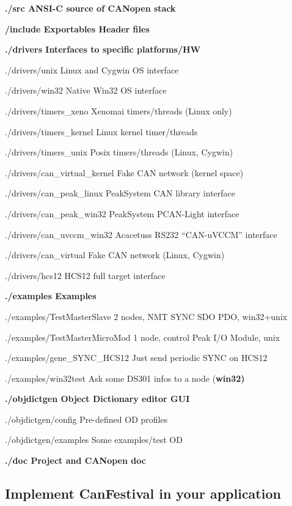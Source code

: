 \documentclass[a4paper,12pt]{book}
\newcommand{\canopen}{CANopen}
\begin{document}
{\ttfamily\bfseries
./src ANSI{}-C source of \canopen{} stack}

{\ttfamily\bfseries
\space /include Exportables Header files}

{\ttfamily\bfseries
./drivers Interfaces to specific platforms/HW}

{\ttfamily
./drivers/unix Linux and Cygwin OS interface}

{\ttfamily
./drivers/win32 Native Win32 OS interface}

{\ttfamily
./drivers/timers\_xeno Xenomai timers/threads (Linux only)}

{\ttfamily
./drivers/timers\_kernel Linux kernel timer/threads}

{\ttfamily
./drivers/timers\_unix Posix timers/threads (Linux, Cygwin)}

{\ttfamily
./drivers/can\_virtual\_kernel Fake CAN network (kernel space)}

{\ttfamily
./drivers/can\_peak\_linux PeakSystem CAN library interface}

{\ttfamily
./drivers/can\_peak\_win32 PeakSystem PCAN{}-Light interface}

{\ttfamily
./drivers/can\_uvccm\_win32 Acacetus{\textquotesingle}s RS232
``CAN{}-uVCCM'' interface}

{\ttfamily
./drivers/can\_virtual Fake CAN network (Linux, Cygwin)}

{\ttfamily
./drivers/hcs12 HCS12 full target interface}

{\ttfamily\bfseries
./examples Examples}

{\ttfamily
./examples/TestMasterSlave 2 nodes, NMT SYNC SDO PDO, win32+unix}

{\ttfamily
./examples/TestMasterMicroMod 1 node, control Peak I/O Module, unix}

{\ttfamily
./examples/gene\_SYNC\_HCS12 Just send periodic SYNC on HCS12}

{\ttfamily
./examples/win32test Ask some DS301 infos to a node (\textbf{win32)}}

{\ttfamily\bfseries
./objdictgen Object Dictionary editor GUI}

{\ttfamily
./objdictgen/config Pre{}-defined OD profiles}

{\ttfamily
./objdictgen/examples Some examples/test OD}

{\ttfamily\bfseries
./doc Project and \canopen{} doc}

\subsection{Implement CanFestival in your application}
 
\end{document}
